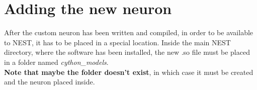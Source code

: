 \documentclass{article}
\begin{document}
\section{Adding the new neuron}
After the custom neuron has been written and compiled, in order to be available to NEST, it has to be placed in a special location. Inside the main NEST directory, where the software has been installed, the new .so file must be placed in a folder named \emph{cython\_models}.\\
\textbf{Note that maybe the folder doesn't exist}, in which case it must be created and the neuron placed inside.
\end{document}
